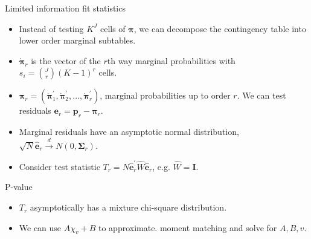 \documentclass[xcolor=dvipsnames,12pt]{beamer}
\begin{document}
  \begin{frame}{Limited information fit statistics}
    \begin{itemize}
      \item Instead of testing $K^J$ cells of $\bm{\pi}$, we can decompose the contingency table into lower order marginal subtables.
      \item $\dot{\bm{\pi}}_r$ is the vector of the $r$th way marginal probabilities with $s_i = \binom{J}{r} (K-1)^r$ cells.
      \item $\bm{\pi}_r = (\dot{\bm{\pi}}_{1}^{'}, \dot{\bm{\pi}}_{2}^{'}, \dots, \dot{\bm{\pi}}_{r}^{'})$, marginal probabilities up to order $r$. We can test residuals $\bm{e}_r = \bm{p}_r - \bm{\pi}_r$.
      \item Marginal residuals have an asymptotic normal distribution, $\sqrt{N}\hat{\bm{e}}_r \overset{d}{\to} N(0, \bm{\Sigma}_r)$.
      \item Consider test statistic $T_r = N\hat{\bm{e}}^{'}_{r} \hat{W} \hat{\bm{e}}_r$, e.g. $\hat{W} = \bm{I}$.
    \end{itemize}
  \end{frame}

  \begin{frame}{P-value}
    \begin{itemize}
      \item $T_r$ asymptotically has a mixture chi-square distribution.
      \item We can use $A\chi_v + B$ to approximate. moment matching and solve for $A, B, v$.
    \end{itemize}
  \end{frame}
\end{document}
